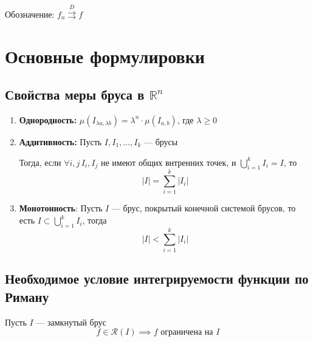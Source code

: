\documentclass[a4paper]{article}
\begin{document}
Обозначение: $f_n\overset{D}{\rightrightarrows} f$

\newpage
\section{Основные формулировки}
\subsection{Свойства меры бруса в $\mathbb{R}^n$}
\begin{enumerate}
    \item \textbf{Однородность:} $\mu(I_{\lambda a,\lambda b})=\lambda^n\cdot\mu(I_{a,b})$, где $\lambda\geqslant
    0$
    \item \textbf{Аддитивность:} Пусть $I, I_1, \ldots, I_k$ — брусы
    
    Тогда, если $\forall i, j\, I_i, I_j$ не имеют общих внтренних точек, и $\displaystyle\bigcup_{i=1}^kI_i = I$, то
    \begin{equation*}
        |I| = \sum_{i=1}^k|I_i|
    \end{equation*}
    \item \textbf{Монотонность}: Пусть $I$ — брус, покрытый конечной системой брусов, то есть $I\subset \displaystyle\bigcup_{i=1}^kI_i$, тогда
    \begin{equation*}
        |I| < \sum_{i=1}^k|I_i|
    \end{equation*}
\end{enumerate}

\subsection{Необходимое условие интегрируемости функции по Риману}
\theorem Пусть $I$ — замкнутый брус
\begin{equation*}
    f\in \mathcal{R}(I) \implies f \text{ ограничена на } I
\end{equation*}
\end{document}

